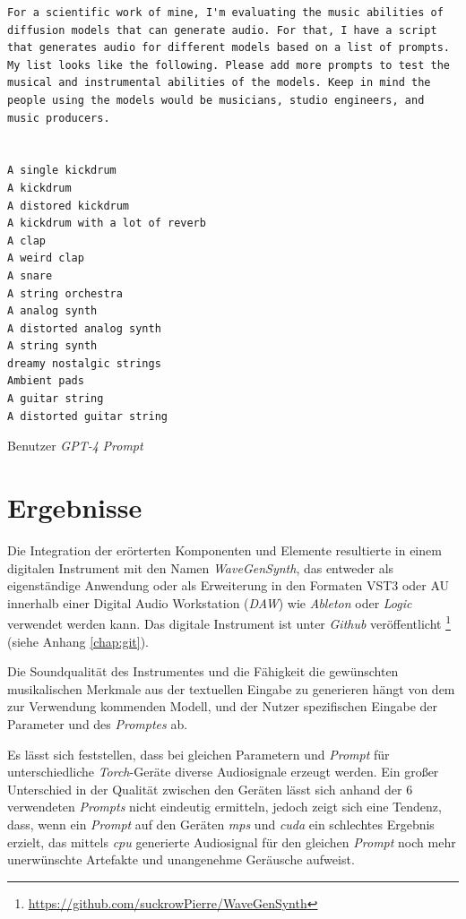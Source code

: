 \documentclass[
  a4paper,  %
  twoside,  %
  bibliography=totoc,
  headsepline,
  cleardoublepage=empty,
  parskip=half,
  draft=false
]{scrbook}
\begin{document}
\begin{Listing}
\begin{lstlisting}[style=gpt]
For a scientific work of mine, I'm evaluating the music abilities of diffusion models that can generate audio. For that, I have a script that generates audio for different models based on a list of prompts. My list looks like the following. Please add more prompts to test the musical and instrumental abilities of the models. Keep in mind the people using the models would be musicians, studio engineers, and music producers. 


A single kickdrum
A kickdrum
A distored kickdrum
A kickdrum with a lot of reverb
A clap
A weird clap
A snare
A string orchestra
A analog synth
A distorted analog synth
A string synth
dreamy nostalgic strings
Ambient pads
A guitar string
A distorted guitar string
\end{lstlisting}
    \caption{Benutzer \emph{GPT-4} \emph{Prompt}}
  \label{lst:prompt}
\end{Listing}

\chapter{Ergebnisse}
Die Integration der erörterten Komponenten und Elemente resultierte in einem digitalen Instrument mit den Namen \emph{WaveGenSynth}, das entweder als eigenständige Anwendung oder als Erweiterung in den Formaten VST3 oder AU innerhalb einer Digital Audio Workstation (\emph{DAW}) wie \emph{Ableton} \cite{noauthor_ableton_nodate} oder \emph{Logic} \cite{noauthor_logic_nodate} verwendet werden kann. Das digitale Instrument ist unter \emph{Github} \cite{noauthor_github_nodate} veröffentlicht \footnote{\url{https://github.com/suckrowPierre/WaveGenSynth}} (siehe Anhang \ref{chap:git}). 

Die Soundqualität des Instrumentes und die Fähigkeit die gewünschten musikalischen Merkmale aus der textuellen Eingabe zu generieren hängt von dem zur Verwendung kommenden Modell, und der Nutzer spezifischen Eingabe der Parameter und des \emph{Promptes} ab. 

Es lässt sich feststellen, dass bei gleichen Parametern und \emph{Prompt} für unterschiedliche \emph{Torch}-Geräte diverse Audiosignale erzeugt werden. Ein großer Unterschied in der Qualität zwischen den Geräten lässt sich anhand der $6$ verwendeten \emph{Prompts} nicht eindeutig ermitteln, jedoch zeigt sich eine Tendenz, dass, wenn ein \emph{Prompt} auf den Geräten \emph{mps} und \emph{cuda} ein schlechtes Ergebnis erzielt, das mittels \emph{cpu} generierte Audiosignal für den gleichen \emph{Prompt} noch mehr unerwünschte Artefakte und unangenehme Geräusche aufweist.
\end{document}

